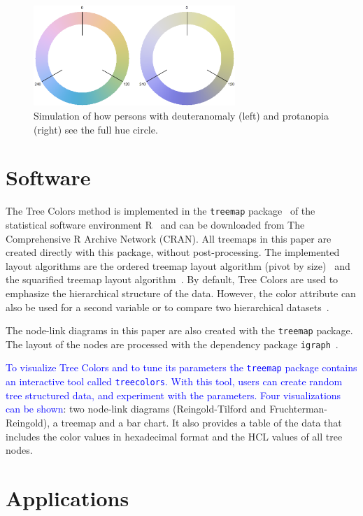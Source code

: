 \documentclass[review,journal]{vgtc}         %
\newcommand{\changedM}[1]{\textcolor{blue}{#1}}
\begin{document}
\begin{figure}[tb]
  \centering
  \includegraphics[width=3in]{hcl_deuteranomaly_protanopia.png}
  \caption{Simulation of how persons with deuteranomaly (left) and protanopia (right) see the full hue circle.}\label{fig:colblind}
\end{figure}


\section{Software}

The Tree Colors method is implemented in the \texttt{treemap} package~\cite{treemap} of the statistical software environment R~\cite{r2013} and can be downloaded from The Comprehensive R Archive Network (CRAN). All treemaps in this paper are created directly with this package, without post-processing. The implemented layout algorithms are the ordered treemap layout algorithm (pivot by size)~\cite{Bederson2002} and the squarified treemap layout algorithm~\cite{bruls99}. By default, Tree Colors are used to emphasize the hierarchical structure of the data. However, the color attribute can also be used for a second variable or to compare two hierarchical datasets~\cite{tennekes2011b}. 

The node-link diagrams in this paper are also created with the \texttt{treemap} package. The layout of the nodes are processed with the dependency package \texttt{igraph}~\cite{igraph}.

\changedM{To visualize Tree Colors and to tune its parameters the \texttt{treemap} package contains an interactive tool called \texttt{treecolors}. With this tool, users can create random tree structured data, and experiment with the parameters. Four visualizations can be shown}: two node-link diagrams (Reingold-Tilford and Fruchterman-Reingold), a treemap and a bar chart. It also provides a table of the data that includes the color values in hexadecimal format and the HCL values of all tree nodes.




\section{Applications}\label{secapplication}
\end{document}
